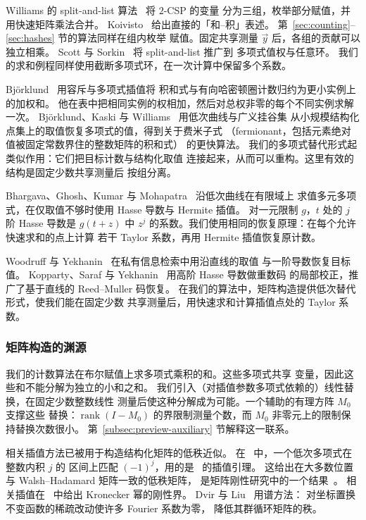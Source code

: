 \documentclass[11pt,reqno]{amsart}
\numberwithin{equation}{section}
\theoremstyle{definition}\newtheorem{definition}[theorem]{定义}
\theoremstyle{remark}\newtheorem{remark}[theorem]{注}
\begin{document}
Williams 的 split-and-list 算法~\cite{Wil05} 将 $2$-CSP 的变量
分为三组，枚举部分赋值，并用快速矩阵乘法合并。
Koivisto~\cite{Koi06} 给出直接的「和--积」表述。
第~\ref{sec:counting}--\ref{sec:hashes} 节的算法同样在组内枚举
赋值。固定共享测量 $\vec y$ 后，各组的贡献可以独立相乘。
Scott 与 Sorkin~\cite[Section~6]{SS09} 将 split-and-list 推广到
多项式值权与任意环。
我们的求和例程同样使用截断多项式环，在一次计算中保留多个系数。

Bj\"orklund~\cite[Sections~2--3]{Bjo16} 用容斥与多项式插值将
积和式与有向哈密顿圈计数归约为更小实例上的加权和。
他在表中把相同实例的权相加，然后对总权非零的每个不同实例求解一次。
Bj\"orklund、Kaski 与 Williams~\cite{BKW19} 用低次曲线与广义挂谷集
从小规模结构化点集上的取值恢复多项式的值，得到关于费米子式
（fermionant，包括元素绝对值被固定常数界住的整数矩阵的积和式）
的更快算法。
我们的多项式替代形式起类似作用：它们把目标计数与结构化取值
连接起来，从而可以重构。这里有效的结构是固定少数共享测量后
按组分离。

Bhargava、Ghosh、Kumar 与
Mohapatra~\cite[Sections~3.1--3.2]{BGKM23} 沿低次曲线在有限域上
求值多元多项式，在仅取值不够时使用 Hasse 导数与 Hermite 插值。
对一元限制 $g$，$t$ 处的 $j$ 阶 Hasse 导数是 $g(t+z)$ 中 $z^j$
的系数。我们使用相同的恢复原理：在每个允许快速求和的点上计算
若干 Taylor 系数，再用 Hermite 插值恢复原计数。

Woodruff 与 Yekhanin~\cite{WY07} 在私有信息检索中用沿直线的取值
与一阶导数恢复目标值。
Kopparty、Saraf 与 Yekhanin~\cite{KSY14} 用高阶 Hasse 导数做重数码
的局部校正，推广了基于直线的 Reed--Muller 码恢复。
在我们的算法中，矩阵构造提供低次替代形式，使我们能在固定少数
共享测量后，用快速求和计算插值点处的 Taylor 系数。

\subsubsection{矩阵构造的渊源}\label{subsec:related-spectral}
我们的计数算法在布尔赋值上求多项式乘积的和。这些多项式共享
变量，因此这些和不能分解为独立的小和之和。
我们引入（对插值参数多项式依赖的）线性替换，在固定少数整数线性
测量后使这种分解成为可能。一个辅助的有理方阵 $M_0$ 支撑这些
替换：$\operatorname{rank}(I-M_0)$ 的界限制测量个数，而 $M_0$
非零元上的限制保持替换次数很小。
第~\ref{subsec:preview-auxiliary} 节解释这一联系。

相关插值方法已被用于构造结构化矩阵的低秩近似。
在~\cite[Section~3]{AW17} 中，一个低次多项式在整数内积 $j$ 的
区间上匹配 $(-1)^j$，用的是~\cite[Lemma~3.1]{AW15} 的插值引理。
这给出在大多数位置与 Walsh--Hadamard 矩阵一致的低秩矩阵，
是矩阵刚性研究中的一个结果~\cite{Val77}。
相关插值在~\cite[Theorem~6.1]{AGP23} 中给出 Kronecker 幂的刚性界。
Dvir 与 Liu~\cite[Claim~2.20 and Lemmas~3.3--3.4]{DL20} 用谱方法：
对坐标置换不变函数的稀疏改动使许多 Fourier 系数为零，
降低其群循环矩阵的秩。
\end{document}
